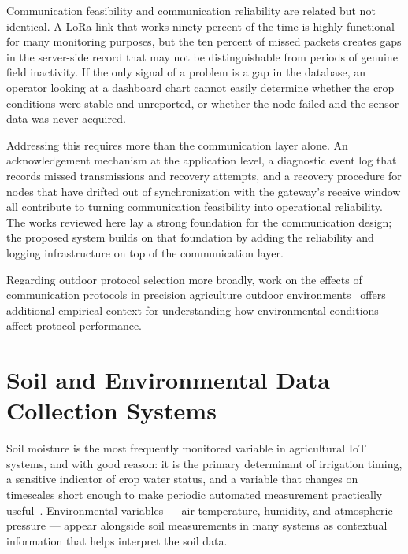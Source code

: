 Communication feasibility and communication reliability are related but not
identical. A LoRa link that works ninety percent of the time is highly
functional for many monitoring purposes, but the ten percent of missed packets
creates gaps in the server-side record that may not be distinguishable from
periods of genuine field inactivity. If the only signal of a problem is a gap
in the database, an operator looking at a dashboard chart cannot easily
determine whether the crop conditions were stable and unreported, or whether
the node failed and the sensor data was never acquired.

Addressing this requires more than the communication layer alone. An
acknowledgement mechanism at the application level, a diagnostic event log
that records missed transmissions and recovery attempts, and a recovery
procedure for nodes that have drifted out of synchronization with the gateway's
receive window all contribute to turning communication feasibility into
operational reliability. The works reviewed here lay a strong foundation for
the communication design; the proposed system builds on that foundation by
adding the reliability and logging infrastructure on top of the communication
layer.

Regarding outdoor protocol selection more broadly, work on the effects of
communication protocols in precision agriculture outdoor
environments~\cite{iot_protocols_precision_agriculture_outdoor} offers
additional empirical context for understanding how environmental conditions
affect protocol
performance.

\section{Soil and Environmental Data Collection Systems}
\label{sec:soil-environmental}

Soil moisture is the most frequently monitored variable in agricultural IoT
systems, and with good reason: it is the primary determinant of irrigation
timing, a sensitive indicator of crop water status, and a variable that changes
on timescales short enough to make periodic automated measurement practically
useful~\cite{ayaz2019iot_smart_agriculture_survey}. Environmental variables
--- air temperature, humidity, and atmospheric pressure --- appear alongside
soil measurements in many systems as contextual information that helps
interpret the soil data.

